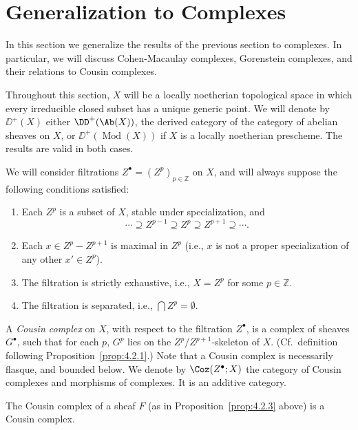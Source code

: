 \section{Generalization to Complexes}\label{sec:4.3}

In this section we generalize the results of the previous section to complexes. In particular, we will discuss Cohen-Macaulay complexes, Gorenstein complexes, and their relations to Cousin complexes.

Throughout this section, $X$ will be a locally noetherian topological space in which every irreducible closed subset has a unique generic point. We will denote by $\DD^+(X)$ either $\DD^+(\Ab(X))$, the derived category of the category of abelian sheaves on $X$, or $\DD^+(\operatorname{Mod}(X))$ if $X$ is a locally noetherian prescheme. The results are valid in both cases.

We will consider filtrations $Z^\bullet=(Z^p)_{p\in\mathbb{Z}}$ on $X$, and will always suppose the following conditions satisfied:
\begin{enumerate}
\item[(1)] Each $Z^p$ is a subset of $X$, stable under specialization, and
\[
\cdots\supseteq Z^{p-1}\supseteq Z^p\supseteq Z^{p+1}\supseteq\cdots.
\]
\item[(2)] Each $x\in Z^{p}-Z^{p+1}$ is maximal in $Z^{p}$ (i.e., $x$ is not a proper specialization of any other $x'\in Z^{p}$).
\item[(3)] The filtration is strictly exhaustive, i.e., $X=Z^p$ for some $p\in\mathbb{Z}$.
\item[(4)] The filtration is separated, i.e., $\bigcap Z^p=\emptyset$.
\end{enumerate}

\begin{definition*}
A \emph{Cousin complex} on $X$, with respect to the filtration $Z^\bullet$, is a complex of sheaves $G^\bullet$, such that for each $p$, $G^p$ lies on the $Z^p/Z^{p+1}$-skeleton of $X$. (Cf.\ definition following Proposition~\ref{prop:4.2.1}.) Note that a Cousin complex is necessarily flasque, and bounded below. We denote by $\Coz(Z^\bullet;X)$ the category of Cousin complexes and morphisms of complexes. It is an additive category.
\end{definition*}

\begin{example*}
The Cousin complex of a sheaf $F$ (as in Proposition~\ref{prop:4.2.3} above) is a Cousin complex.
\end{example*}

